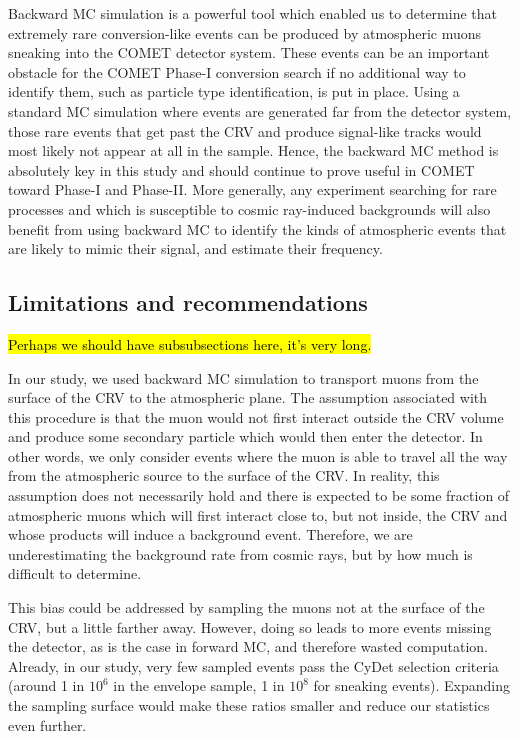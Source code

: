 Backward MC simulation is a powerful tool which enabled us to determine that
extremely rare conversion-like events can be produced by atmospheric muons
sneaking into the COMET detector system. These events can be an important
obstacle for the COMET Phase-I conversion search if no additional way to
identify them, such as particle type identification, is put in place. Using a
standard MC simulation where events are generated far from the detector system,
those rare events that get past the CRV and produce signal-like tracks would
most likely not appear at all in the sample. Hence, the backward MC method is
absolutely key in this study and should continue to prove useful in COMET toward
Phase-I and Phase-II. More generally, any experiment searching for rare
processes and which is susceptible to cosmic ray-induced backgrounds will also
benefit from using backward MC to identify the kinds of atmospheric events that
are likely to mimic their signal, and estimate their frequency.

\subsection{Limitations and recommendations}

\hl{Perhaps we should have subsubsections here, it's very long.}

In our study, we used backward MC simulation to transport muons from the surface
of the CRV to the atmospheric plane. The assumption associated with this
procedure is that the muon would not first interact outside the CRV volume and
produce some secondary particle which would then enter the detector. In other
words, we only consider events where the muon is able to travel all the way
from the atmospheric source to the surface of the CRV.
In reality, this assumption does not necessarily hold and there is expected to
be some fraction of atmospheric muons which will first interact close to, but
not inside, the CRV and whose products will induce a background event.
Therefore, we are underestimating the background rate from cosmic rays, but by
how much is difficult to determine. 

This bias could be addressed by sampling the muons not at the surface of the
CRV, but a little farther away. However, doing so leads to more events missing
the detector, as is the case in forward MC, and therefore wasted computation.
Already, in our study, very few sampled events pass the CyDet selection criteria
(around 1 in $10^6$ in the envelope sample, 1 in $10^8$ for sneaking events).
Expanding the sampling surface would make these ratios smaller and reduce our
statistics even further. %

